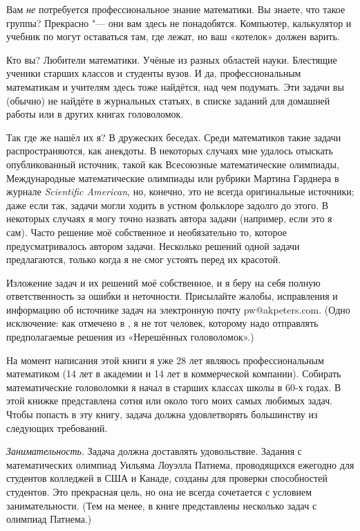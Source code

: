 \documentclass[twoside]{book}
\begin{document}
Вам \emph{не} потребуется профессиональное знание математики.
Вы знаете, что такое группы? Прекрасно "---  они вам здесь не понадобятся.
Компьютер, калькулятор и учебник по  могут оставаться там, где лежат, но ваш «котелок» должен варить.

Кто вы? Любители математики.
Учёные из разных областей науки.
Блестящие ученики старших классов и студенты вузов.
И да, профессиональным математикам и учителям здесь тоже найдётся, над чем подумать.
Эти задачи вы (обычно) не найдёте в журнальных статьях, в списке заданий для домашней работы или в других книгах головоломок.

Так где же нашёл их я? В дружеских беседах.
Среди математиков такие задачи распространяются, как анекдоты.
В некоторых случаях мне удалось отыскать опубликованный источник, такой как Всесоюзные математические олимпиады, Международные математические олимпиады или рубрики Мартина Гарднера в журнале \emph{Scientific American}, но, конечно, это не всегда оригинальные источники;
даже если так, задачи могли ходить в устном фольклоре задолго до этого.
В некоторых случаях я могу точно назвать автора задачи (например, если это я сам).
Часто решение моё собственное и необязательно то, которое предусматривалось автором задачи.
Несколько решений одной задачи предлагаются, только когда я не смог устоять перед их красотой.

Изложение задач и их решений моё собственное, и я беру на себя полную ответственность за ошибки и неточности.
Присылайте жалобы, исправления и информацию об источнике задач на электронную почту pw@akpeters.com.
(Одно исключение: как отмечено в , я не тот человек, которому надо отправлять предполагаемые решения из «Нерешённых головоломок».)

На момент написания этой книги я уже 28 лет являюсь профессиональным математиком
(14 лет в академии и 14 лет в коммерческой компании).
Собирать математические головоломки я начал в старших классах школы в 60-х годах.
В этой книжке представлена сотня или около того моих самых любимых задач.
Чтобы попасть в эту книгу, задача должна удовлетворять большинству из следующих требований.

\textit{Занимательность.}
Задача должна доставлять удовольствие.
Задания с математических олимпиад Уильяма Лоуэлла Патнема, проводящихся ежегодно для студентов колледжей в США и Канаде, созданы для проверки способностей студентов.
Это прекрасная цель, но она не всегда сочетается с условием занимательности.
(Тем на менее, в книге представлены несколько задач с олимпиад Патнема.)
\end{document}
